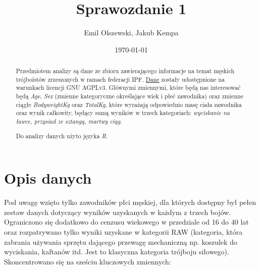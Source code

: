 \documentclass{article}\usepackage[]{graphicx}\usepackage[]{xcolor}
\author{Emil Olszewski, Jakub Kempa}
\date{\today}
\title{Sprawozdanie 1}
\begin{document}
\maketitle

\begin{abstract}

Przedmiotem analizy są dane ze zbioru zawierającego informacje na temat 
męskich trójboistów zrzeszonych w ramach federacji IPF. \href{https://gitlab.com/openpowerlifting/opl-data}{Dane} zostały udostępnione na warunkach licencji GNU AGPLv3. 
Głównymi zmiennymi, które będą nas interesować będą \textit{Age}, \textit{Sex} (zmienne kategoryczne określające wiek i płeć zawodnika) oraz zmienne ciągłe \textit{BodyweightKg} oraz \textit{TotalKg}, które wyrażają odpowiednio masę ciała zawodnika oraz wynik całkowity, będący sumą wyników w trzech kategoriach: \textit{wyciskanie na ławce, przysiad ze sztangą, martwy ciąg}.

Do analizy danych użyto języka \textit{R}.

\end{abstract}

\section{Opis danych} 
Pod uwagę wzięto tylko zawodników płci męskiej, dla których dostępny był pełen zestaw danych dotyczący wyników uzyskanych w każdym z trzech bojów. Ograniczono się dodatkowo do cenzusu wiekowego w przedziale od 16 do 40 lat oraz rozpatrywano tylko wyniki uzyskane w kategorii RAW (kategoria, która zabrania używania sprzętu dającego przewagę mechaniczną np. koszulek do wyciskania, kaftanów itd. Jest to klasyczna kategoria trójboju siłowego). \\
Skoncentrowano się na sześciu kluczowych zmiennych:
\end{document}
